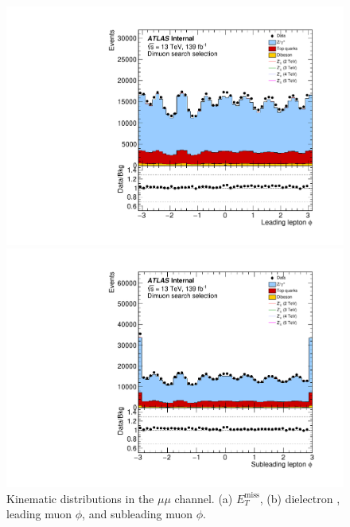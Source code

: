 {\begin{figure}[h!]
\begin{minipage}[b]{.45\linewidth}
    \includegraphics[width=1\textwidth]{figures/ci/dataMc/stacks_mc16e_2015-2018_uu_phi1.pdf}
    \subcaption{}
\end{minipage}
\begin{minipage}[b]{.45\linewidth}
    \includegraphics[width=1\textwidth]{figures/ci/dataMc/stacks_mc16e_2015-2018_uu_phi2.pdf}
    \subcaption{}
\end{minipage}
\caption{Kinematic distributions in the $\mu\mu$ channel. (a) $E_T^\text{miss}$, (b) dielectron \pt, leading muon $\phi$, and subleading muon $\phi$.}
\label{fig:}
\end{figure}
\clearpage
}

